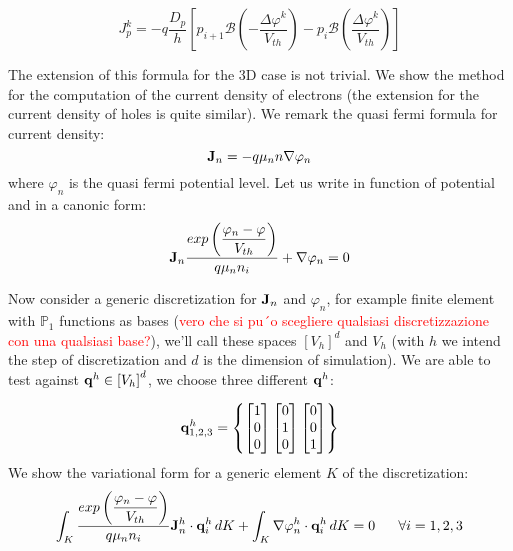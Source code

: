 \begin{equation}
\label{eq: scharfetter gummel 1D hole}
J_p^k=-q\frac{D_p}{h}
\left[ p_{i+1}\mathcal{B}\left(-\frac{\Delta \varphi^k}{V_{th}}\right)- p_i\mathcal{B}\left(\frac{\Delta \varphi^k}{V_{th}}\right)\right] 
\end{equation} 


The extension of this formula for the 3D case is not trivial. We show the method for the computation of the current density of electrons (the extension for the current density of holes is quite similar).
We remark the quasi fermi formula for current density:
\begin{equation}
\label{eq: current density fermi}
\mathbf{J}_n=-q \mu_n n \nabla \varphi_n
\end{equation}
where $\varphi_n$ is the quasi fermi potential level. Let us write  in function of potential and in a canonic form:
\begin{equation}
\label{eq: current density canonic form}
\mathbf{J}_n\dfrac{ exp\left(\dfrac{\varphi_n-\varphi}{V_{th}}\right)}{q \mu_n n_i} + \nabla \varphi_n = 0
\end{equation}

Now consider a generic discretization for $\mathbf{J}_n$ and $\varphi_n$, for example finite element with $\mathbb{P}_1$ functions as bases (\textcolor{red}{vero che si pu´o scegliere qualsiasi discretizzazione con una qualsiasi base?}), we'll call these spaces $\left[ V_h \right]^d$ and $V_h$ (with $h$ we intend the step of discretization and $d$ is the dimension of simulation). We are able to test  against $\mathbf{q}^h \in \left[ V_h \right]^d$, we choose three  different $\mathbf{q}^h$:

\begin{equation}
\label{eq: form of qh}
\mathbf{q}^h_{1,2,3} = \left\{ \begin{bmatrix} 1 \\ 0 \\ 0 \end{bmatrix}  \begin{bmatrix} 0 \\ 1 \\ 0 \end{bmatrix}  \begin{bmatrix} 0 \\ 0 \\ 1 \end{bmatrix}  \right\}
\end{equation}
We show the variational form for a generic element $K$ of the discretization:
\begin{equation}
\label{eq: variation form of current density}
\int_K \dfrac{ exp \left( \dfrac{\varphi_n-\varphi}{V_{th}} \right) }{q \mu_n n_i} \vect{J}_n^h \cdot \vect{q}^h_i \, dK
 + \int_K \nabla \varphi_n^h \cdot \vect{q}^h_i \, dK = 0 \psp{10} \forall i=1,2,3
\end{equation}

